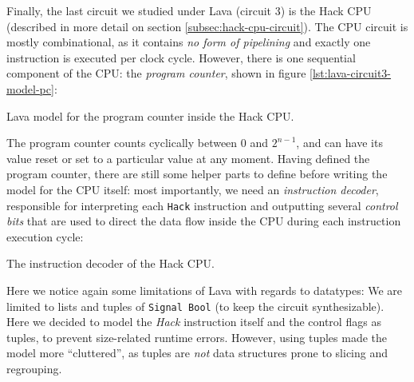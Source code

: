 \documentclass[a4paper]{article}
\begin{document}
                Finally, the last circuit we studied under Lava (circuit 3) is the Hack CPU
                (described in more detail on section \ref{subsec:hack-cpu-circuit}). The CPU circuit
                is mostly combinational, as it contains \emph{no form of pipelining} and
                exactly one instruction is executed per clock cycle. However, there is one
                sequential component of the CPU: the \emph{program counter}, shown in figure
                \ref{lst:lava-circuit3-model-pc}:

                \begin{listing}[h!]
                    \caption{Lava model for the program counter inside the Hack CPU.
                        \label{lst:lava-circuit3-model-pc}}
                \end{listing}

                The program counter counts cyclically between $ 0 $ and $ 2^{n-1} $, and can have
                its value reset or set to a particular value at any moment. Having defined the
                program counter, there are still some helper parts to define before writing
                the model for the CPU itself: most importantly, we need an \emph{instruction
                    decoder}, responsible for interpreting each \texttt{Hack} instruction and
                outputting several \emph{control bits} that are used to direct the data flow inside
                the CPU during each instruction execution cycle:

                \begin{listing}[h!]
                    \caption{The instruction decoder of the Hack CPU.
                        \label{lst:lava-circuit3-model-decoder}}
                \end{listing}

                Here we notice again some limitations of Lava with regards to datatypes: We are
                limited to lists and tuples of \texttt{Signal Bool} (to keep the circuit
                synthesizable). Here we decided to model the \emph{Hack} instruction itself and
                the control flags as tuples, to prevent size-related runtime errors. However, using
                tuples made the model more ``cluttered'', as tuples are \emph{not} data structures
                prone to slicing and regrouping.
\end{document}
